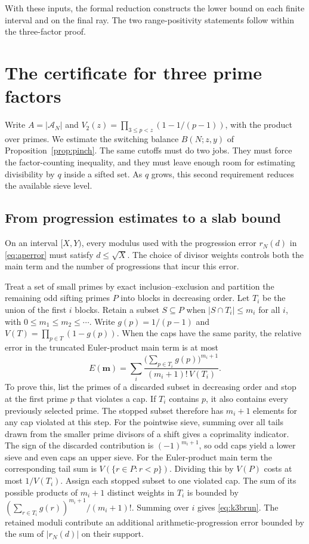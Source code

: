 \documentclass[11pt]{article}
\theoremstyle{remark}\newtheorem{remark}[theorem]{Remark}
\begin{document}
With these inputs, the formal reduction constructs the lower bound on each finite interval and on the final ray. The two range-positivity statements follow within the three-factor proof.

\section{The certificate for three prime factors}\label{sec:k3}

Write $A=|\mathcal A_N|$ and $V_2(z)=\prod_{3\le p<z}(1-1/(p-1))$, with the product over primes. We estimate the switching balance $B(N;z,y)$ of Proposition~\ref{prop:pinch}. The same cutoffs must do two jobs. They must force the factor-counting inequality, and they must leave enough room for estimating divisibility by $q$ inside a sifted set. As $q$ grows, this second requirement reduces the available sieve level.

\subsection{From progression estimates to a slab bound}

On an interval $[X,Y)$, every modulus used with the progression error $r_N(d)$ in \eqref{eq:aperror} must satisfy $d\le\sqrt X$. The choice of divisor weights controls both the main term and the number of progressions that incur this error.

Treat a set of small primes by exact inclusion--exclusion and partition the remaining odd sifting primes $P$ into blocks in decreasing order. Let $T_i$ be the union of the first $i$ blocks. Retain a subset $S\subseteq P$ when $|S\cap T_i|\le m_i$ for all $i$, with $0\le m_1\le m_2\le\cdots$. Write $g(p)=1/(p-1)$ and $V(T)=\prod_{p\in T}(1-g(p))$. When the caps have the same parity, the relative error in the truncated Euler-product main term is at most
\begin{equation}\label{eq:k3brun}
 E(\boldsymbol m)=\sum_i
 \frac{\bigl(\sum_{p\in T_i}g(p)\bigr)^{m_i+1}}
 {(m_i+1)!\,V(T_i)} .
\end{equation}
To prove this, list the primes of a discarded subset in decreasing order and stop at the first prime $p$ that violates a cap. If $T_i$ contains $p$, it also contains every previously selected prime. The stopped subset therefore has $m_i+1$ elements for any cap violated at this step. For the pointwise sieve, summing over all tails drawn from the smaller prime divisors of a shift gives a coprimality indicator. The sign of the discarded contribution is $(-1)^{m_i+1}$, so odd caps yield a lower sieve and even caps an upper sieve. For the Euler-product main term the corresponding tail sum is $V(\{r\in P:r<p\})$. Dividing this by $V(P)$ costs at most $1/V(T_i)$. Assign each stopped subset to one violated cap. The sum of its possible products of $m_i+1$ distinct weights in $T_i$ is bounded by $(\sum_{r\in T_i}g(r))^{m_i+1}/(m_i+1)!$. Summing over $i$ gives \eqref{eq:k3brun}. The retained moduli contribute an additional arithmetic-progression error bounded by the sum of $|r_N(d)|$ on their support.
\end{document}
